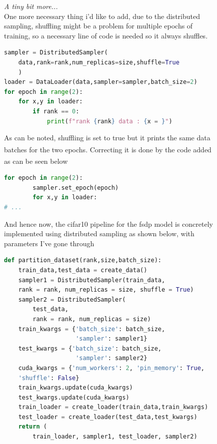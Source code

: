 \documentclass[12pt]{article}
\newcommand{\customtext}[3]{%
    \vspace{#2} %
    \fontsize{13}{8}\textcolor{#1}{\textit{#3}}%
}
\newcommand{\sidecite}[1]{\textsuperscript{\textcolor{blue}{\textbf{\scriptsize#1}}}}
\newcommand{\maincitecount}{\sidecite{\stepcounter{maincite}\themaincite}}
\begin{document}
\begin{figure}[!htb]
    \begin{minipage}[t]{0.65\textwidth}
    \customtext{xtitle}{0em}{A tiny bit more...}\\
    One more necessary thing i'd like to add, due to the distributed sampling, shuffling might be a 
    problem for multiple epochs of training, so a necessary line of code is needed so it always shuffles.
\begin{lstlisting}[language=python,style=python,basicstyle=\ttfamily\footnotesize]
sampler = DistributedSampler(
    data,rank=rank,num_replicas=size,shuffle=True
    )
loader = DataLoader(data,sampler=sampler,batch_size=2)
for epoch in range(2):
    for x,y in loader:
        if rank == 0:
            print(f"rank {rank} data : {x = }")
\end{lstlisting}
As can be noted, shuffling is set to true but it prints the same data batches for the
two epochs\maincitecount. Correcting it is done by the code added as can be seen 
below\maincitecount 
\begin{lstlisting}[language=python,style=python,basicstyle=\ttfamily\footnotesize]
    for epoch in range(2):
        sampler.set_epoch(epoch)
        for x,y in loader:
# ...
\end{lstlisting}
And hence now, the cifar10 pipeline for the fsdp model is concretely implemented using 
distributed sampling as shown below, with parameters I've gone through
\begin{lstlisting}[language=python,style=python,basicstyle=\ttfamily\footnotesize]
def partition_dataset(rank,size,batch_size):
    train_data,test_data = create_data()
    sampler1 = DistributedSampler(train_data, 
    rank = rank, num_replicas = size, shuffle = True)
    sampler2 = DistributedSampler(
        test_data, 
        rank = rank, num_replicas = size)
    train_kwargs = {'batch_size': batch_size, 
                    'sampler': sampler1}
    test_kwargs = {'batch_size': batch_size, 
                    'sampler': sampler2}
    cuda_kwargs = {'num_workers': 2, 'pin_memory': True, 
    'shuffle': False}
    train_kwargs.update(cuda_kwargs)
    test_kwargs.update(cuda_kwargs)
    train_loader = create_loader(train_data,train_kwargs)
    test_loader = create_loader(test_data,test_kwargs)
    return (
        train_loader, sampler1, test_loader, sampler2) 
\end{lstlisting}
\vspace*{-3em}

\end{minipage}
\end{figure}
\end{document}

